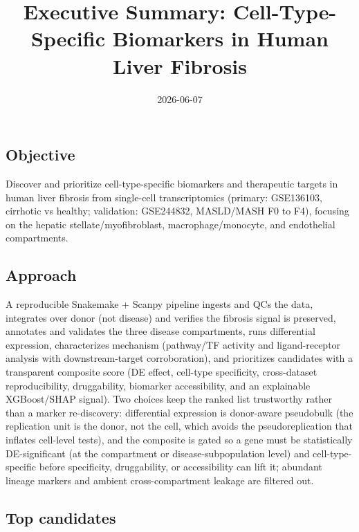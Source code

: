 \documentclass[
  10pt,
  letterpaper,
  DIV=11,
  numbers=noendperiod]{scrartcl}
\title{Executive Summary: Cell-Type-Specific Biomarkers in Human Liver
Fibrosis}
\author{}
\date{2026-06-07}
\begin{document}
\maketitle


\subsection{Objective}\label{objective}

Discover and prioritize cell-type-specific biomarkers and therapeutic
targets in human liver fibrosis from single-cell transcriptomics
(primary: GSE136103, cirrhotic vs healthy; validation: GSE244832,
MASLD/MASH F0 to F4), focusing on the hepatic stellate/myofibroblast,
macrophage/monocyte, and endothelial compartments.

\subsection{Approach}\label{approach}

A reproducible Snakemake + Scanpy pipeline ingests and QCs the data,
integrates over donor (not disease) and verifies the fibrosis signal is
preserved, annotates and validates the three disease compartments, runs
differential expression, characterizes mechanism (pathway/TF activity
and ligand-receptor analysis with downstream-target corroboration), and
prioritizes candidates with a transparent composite score (DE effect,
cell-type specificity, cross-dataset reproducibility, druggability,
biomarker accessibility, and an explainable XGBoost/SHAP signal). Two
choices keep the ranked list trustworthy rather than a marker
re-discovery: differential expression is donor-aware pseudobulk (the
replication unit is the donor, not the cell, which avoids the
pseudoreplication that inflates cell-level tests), and the composite is
gated so a gene must be statistically DE-significant (at the compartment
or disease-subpopulation level) and cell-type-specific before
specificity, druggability, or accessibility can lift it; abundant
lineage markers and ambient cross-compartment leakage are filtered out.

\subsection{Top candidates}\label{top-candidates}
\end{document}
